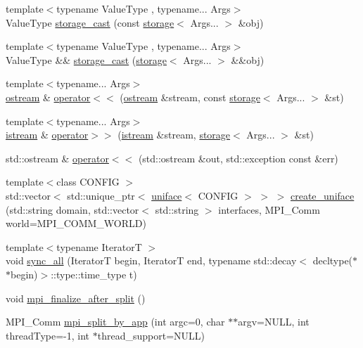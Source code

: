 \begin{DoxyCompactItemize}
\item 
{\footnotesize template$<$typename Value\+Type , typename... Args$>$ }\\Value\+Type \hyperlink{namespacemui_a5cf84b0135c75c6adcc2edbb501fa2f4}{storage\+\_\+cast} (const \hyperlink{structmui_1_1storage}{storage}$<$ Args... $>$ \&obj)
\item 
{\footnotesize template$<$typename Value\+Type , typename... Args$>$ }\\Value\+Type \&\& \hyperlink{namespacemui_a14f2617b6b44b2b34377eb403f0195b1}{storage\+\_\+cast} (\hyperlink{structmui_1_1storage}{storage}$<$ Args... $>$ \&\&obj)
\item 
{\footnotesize template$<$typename... Args$>$ }\\\hyperlink{classmui_1_1ostream}{ostream} \& \hyperlink{namespacemui_ae1e6038082682fd4b840fcb58d9ae2e0}{operator$<$$<$} (\hyperlink{classmui_1_1ostream}{ostream} \&stream, const \hyperlink{structmui_1_1storage}{storage}$<$ Args... $>$ \&st)
\item 
{\footnotesize template$<$typename... Args$>$ }\\\hyperlink{classmui_1_1istream}{istream} \& \hyperlink{namespacemui_a4789207f36735ea6248dfc01a4e326b1}{operator$>$$>$} (\hyperlink{classmui_1_1istream}{istream} \&stream, \hyperlink{structmui_1_1storage}{storage}$<$ Args... $>$ \&st)
\item 
std\+::ostream \& \hyperlink{namespacemui_af3c71f2b8c435b7dc118810da8bb52b3}{operator$<$$<$} (std\+::ostream \&out, std\+::exception const \&err)
\item 
{\footnotesize template$<$class C\+O\+N\+F\+IG $>$ }\\std\+::vector$<$ std\+::unique\+\_\+ptr$<$ \hyperlink{classmui_1_1uniface}{uniface}$<$ C\+O\+N\+F\+IG $>$ $>$ $>$ \hyperlink{namespacemui_ab54f20289cc2f21630056ddd48782822}{create\+\_\+uniface} (std\+::string domain, std\+::vector$<$ std\+::string $>$ interfaces, M\+P\+I\+\_\+\+Comm world=M\+P\+I\+\_\+\+C\+O\+M\+M\+\_\+\+W\+O\+R\+LD)
\item 
{\footnotesize template$<$typename IteratorT $>$ }\\void \hyperlink{namespacemui_a8f8d926aa60ce9ee8502b1822e5efa90}{sync\+\_\+all} (IteratorT begin, IteratorT end, typename std\+::decay$<$ decltype($\ast$$\ast$begin)$>$\+::type\+::time\+\_\+type t)
\item 
void \hyperlink{namespacemui_abe9148226c03a5fe5561908983256d58}{mpi\+\_\+finalize\+\_\+after\+\_\+split} ()
\item 
M\+P\+I\+\_\+\+Comm \hyperlink{namespacemui_adfc9c731622ab68ad20ad688dcb07933}{mpi\+\_\+split\+\_\+by\+\_\+app} (int argc=0, char $\ast$$\ast$argv=N\+U\+LL, int thread\+Type=-\/1, int $\ast$thread\+\_\+support=N\+U\+LL)

\end{DoxyCompactItemize}
